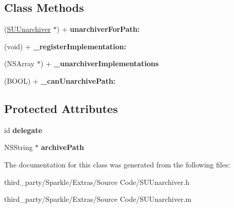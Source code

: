 \subsection*{Class Methods}
\begin{DoxyCompactItemize}
\item 
\mbox{\label{interface_s_u_unarchiver_ae5966136462b637c134a79a29db1ad46}} 
(\mbox{\hyperlink{interface_s_u_unarchiver}{S\+U\+Unarchiver}} $\ast$) + {\bfseries unarchiver\+For\+Path\+:}
\item 
\mbox{\label{interface_s_u_unarchiver_ac0632dd9d46576e8444a705b8cac1260}} 
(void) + {\bfseries \+\_\+register\+Implementation\+:}
\item 
\mbox{\label{interface_s_u_unarchiver_a33d5de08bf23c752ff518b4b4146e2c9}} 
(N\+S\+Array $\ast$) + {\bfseries \+\_\+unarchiver\+Implementations}
\item 
\mbox{\label{interface_s_u_unarchiver_a71e739bb08f1ed6335e41f9b3bda090a}} 
(B\+O\+OL) + {\bfseries \+\_\+can\+Unarchive\+Path\+:}
\end{DoxyCompactItemize}
\subsection*{Protected Attributes}
\begin{DoxyCompactItemize}
\item 
\mbox{\label{interface_s_u_unarchiver_ab9d96b436c09d600ac0abdc7692c49cf}} 
id {\bfseries delegate}
\item 
\mbox{\label{interface_s_u_unarchiver_adb2af27550e3dc0aeef1cd9d649e462d}} 
N\+S\+String $\ast$ {\bfseries archive\+Path}
\end{DoxyCompactItemize}


The documentation for this class was generated from the following files\+:\begin{DoxyCompactItemize}
\item 
third\+\_\+party/\+Sparkle/\+Extras/\+Source Code/S\+U\+Unarchiver.\+h\item 
third\+\_\+party/\+Sparkle/\+Extras/\+Source Code/S\+U\+Unarchiver.\+m\end{DoxyCompactItemize}

